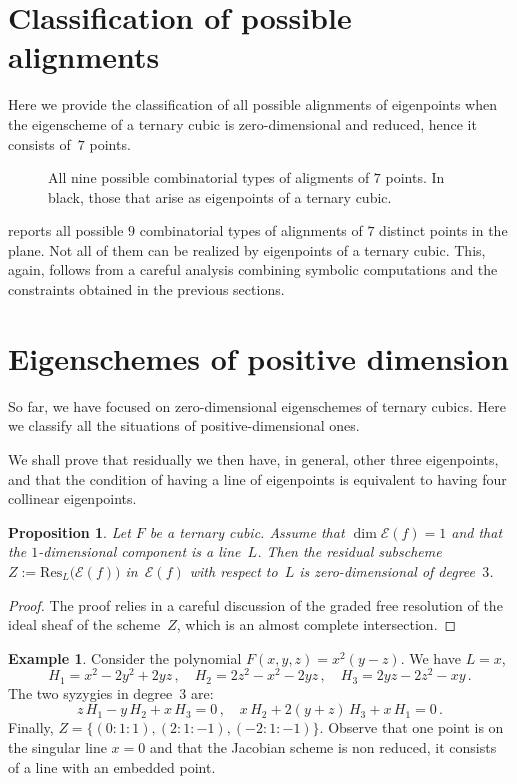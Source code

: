 \documentclass[11pt, a4paper, reqno, captions=tableheading,bibliography=totoc]{scrartcl}
\theoremstyle{plain}
\newtheorem{prop}[lemma]{Proposition}
\theoremstyle{definition}
\newtheorem{es}[lemma]{Example}
\newcommand{\Eig}[1]{\mathcal{E}\!\left( {#1} \right)}
\begin{document}
\section{Classification of possible alignments}
\label{alignments}

Here we provide the classification of all possible alignments of eigenpoints when the eigenscheme of a ternary cubic is zero-dimensional and reduced, hence it consists of~$7$ points.

\begin{figure}

 \label{figure:alignments}
 \caption{All nine possible combinatorial types of aligments of $7$ points. In black, those that arise as eigenpoints of a ternary cubic.}
\end{figure}


 reports all possible $9$ combinatorial types of alignments of $7$ distinct points in the plane. Not all of them can be realized by eigenpoints of a ternary cubic.
This, again, follows from a careful analysis combining symbolic computations and the constraints obtained in the previous sections.

\section{Eigenschemes of positive dimension}
\label{positive_dimensional}

So far, we have focused on zero-dimensional eigenschemes of ternary cubics.
Here we classify all the situations of positive-dimensional ones.

We shall prove that residually we then have, in general, other three eigenpoints, and that the condition of having a line of eigenpoints is equivalent to having four collinear eigenpoints.

\begin{prop}
\label{p2}
Let $F$ be a ternary cubic.
Assume that $\dim \Eig{f} = 1$ and that the $1$-dimensional component is a line~$L$.
Then the residual subscheme $Z := \mathrm{Res}_L \bigl( \Eig{f} \bigr)$ in~$\Eig{f}$ with respect to~$L$ is zero-dimensional of degree~$3$.
\end{prop}
\begin{proof}
The proof relies in a careful discussion of the graded free resolution of the ideal sheaf of the scheme~$Z$, which is an almost complete intersection.
\end{proof}

\begin{es}
Consider the polynomial $F(x, y, z) = x^2 (y - z)$.
We have $L = x$,
%
\[
 H_1 = x^2-2y^2+2y z \,,
 \quad
 H_2 = 2z^2-x^2-2y z \,,
 \quad
 H_3 = 2yz-2z^2-xy \,.
\]
%
The two syzygies in degree~$3$ are:
%
\[
 z \, H_1 - y \, H_2 + x \, H_3 = 0 \,,
 \quad
 x \, H_2 + 2(y+z) \, H_3 + x \, H_1 = 0 \,.
\]
%
Finally, $Z = \bigl\{ (0:1:1), (2:1:-1), (-2:1:-1) \bigr\}$. Observe that one point is on the singular line $x = 0$
and that the Jacobian scheme is non reduced, it consists of a line with an embedded point.
\end{es}
\end{document}
